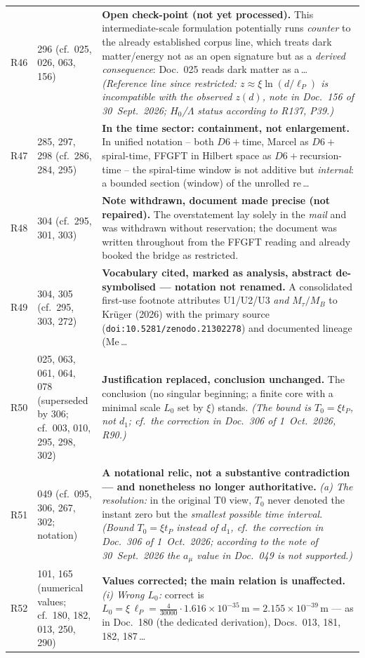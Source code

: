 \begin{longtable}{@{}p{0.9cm}p{3.1cm}p{10.2cm}@{}}
R46 & 296 (cf.\ 025, 026, 063, 156) & \textbf{Open check-point (not yet processed).} This intermediate-scale formulation potentially runs \emph{counter} to the already established corpus line, which treats dark matter/energy not as an open signature but as a \emph{derived consequence}: Doc.~025 reads dark matter as a\,\ldots{} \emph{(Reference line since restricted: $z\approx\xi\ln(d/\ell_P)$ is incompatible with the observed $z(d)$, note in Doc.~156 of 30~Sept.~2026; $H_0$/$\Lambda$ status according to R137, P39.)} \\
R47 & 285, 297, 298 (cf.\ 286, 284, 295) & \textbf{In the time sector: containment, not enlargement.} In unified notation -- both $D6+$time, Marcel as $D6+$spiral-time, FFGFT in Hilbert space as $D6+$recursion-time -- the spiral-time window is not additive but \emph{internal}: a bounded section (window) of the unrolled re\,\ldots \\
R48 & 304 (cf.\ 295, 301, 303) & \textbf{Note withdrawn, document made precise (not repaired).} The overstatement lay solely in the \emph{mail} and was withdrawn without reservation; the document was written throughout from the FFGFT reading and already booked the bridge as restricted. \\
R49 & 304, 305 (cf.\ 295, 303, 272) & \textbf{Vocabulary cited, marked as analysis, abstract de-symbolised --- notation not renamed.} A consolidated first-use footnote attributes U1/U2/U3 \emph{and} $M_\tau/M_B$ to Krüger (2026) with the primary source (\texttt{doi:10.5281/zenodo.21302278}) and documented lineage (Me\,\ldots \\
R50 & 025, 063, 061, 064, 078 (superseded by 306; cf.\ 003, 010, 295, 298, 302) & \textbf{Justification replaced, conclusion unchanged.} The conclusion (no singular beginning; a finite core with a minimal scale $L_0$ set by $\xi$) stands. \emph{(The bound is $T_0=\xi t_P$, not $d_1$; cf.\ the correction in Doc.~306 of 1~Oct.~2026, R90.)} \\
R51 & 049 (cf.\ 095, 306, 267, 302; notation) & \textbf{A notational relic, not a substantive contradiction --- and nonetheless no longer authoritative.} \emph{(a) The resolution:} in the original T0 view, $T_0$ never denoted the instant zero but the \emph{smallest possible time interval}. \emph{(Bound $T_0=\xi t_P$ instead of $d_1$, cf.\ the correction in Doc.~306 of 1~Oct.~2026; according to the note of 30~Sept.~2026 the $a_\mu$ value in Doc.~049 is not supported.)} \\
R52 & 101, 165 (numerical values; cf.\ 180, 182, 013, 250, 290) & \textbf{Values corrected; the main relation is unaffected.} \emph{(i) Wrong $L_0$:} correct is $L_0 = \xi\,\ell_P = \tfrac{4}{30000}\cdot 1.616\times10^{-35}\,\text{m} = \boxed{2.155\times10^{-39}\,\text{m}}$ --- as in Doc.~180 (the dedicated derivation), Docs.~013, 181, 182, 187\,\ldots \\

\end{longtable}

